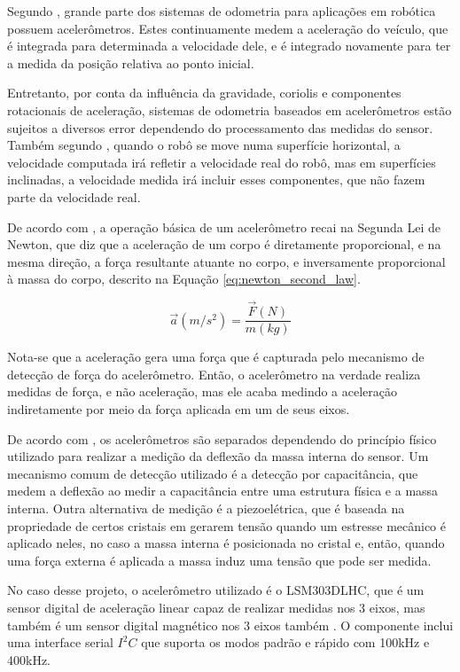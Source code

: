 \documentclass[acronym, symbols]{fei}
\begin{document}
				Segundo \textcite{NISTLER2011413}, grande parte dos sistemas de odometria para aplicações em robótica possuem acelerômetros. Estes continuamente medem a aceleração do veículo, que é integrada para determinada a velocidade dele, e é integrado novamente para ter a medida da posição relativa ao ponto inicial.
				
				Entretanto, por conta da influência da gravidade, coriolis e componentes rotacionais de aceleração, sistemas de odometria baseados em acelerômetros estão sujeitos a diversos error dependendo do processamento das medidas do sensor. Também segundo \textcite{NISTLER2011413}, quando o robô se move numa superfície horizontal, a velocidade computada irá refletir a velocidade real do robô, mas em superfícies inclinadas, a velocidade medida irá incluir esses componentes, que não fazem parte da velocidade real.
			
				De acordo com \textcite{dadafshar2014accelerometer}, a operação básica de um acelerômetro recai na Segunda Lei de Newton, que diz que a aceleração de um corpo é diretamente proporcional, e na mesma direção, a força resultante atuante no corpo, e inversamente proporcional à massa do corpo, descrito na Equação \ref{eq:newton_second_law}.
				
				\begin{equation}\label{eq:newton_second_law}
					\overrightarrow{a}(m/s^2) = \frac{\overrightarrow{F}(N)}{m(kg)}
				\end{equation}
			
				Nota-se que a aceleração gera uma força que é capturada pelo mecanismo de detecção de força do acelerômetro. Então, o acelerômetro na verdade realiza medidas de força, e não aceleração, mas ele acaba medindo a aceleração indiretamente por meio da força aplicada em um de seus eixos.
				
				De acordo com \textcite{siegwart2011introduction}, os acelerômetros são separados dependendo do princípio físico utilizado para realizar a medição da deflexão da massa interna do sensor. Um mecanismo comum de detecção utilizado é a detecção por capacitância, que medem a deflexão ao medir a capacitância entre uma estrutura física e a massa interna. Outra alternativa de medição é a piezoelétrica, que é baseada na propriedade de certos cristais em gerarem tensão quando um estresse mecânico é aplicado neles, no caso a massa interna é posicionada no cristal e, então, quando uma força externa é aplicada a massa induz uma tensão que pode ser medida.
				
				No caso desse projeto, o acelerômetro utilizado é o LSM303DLHC, que é um sensor digital de aceleração linear capaz de realizar medidas nos 3 eixos, mas também é um sensor digital magnético nos 3 eixos também \cite{datasheet_accel}. O componente inclui uma interface serial $I^2C$ que suporta os modos padrão e rápido com 100kHz e 400kHz.
				
\end{document}
